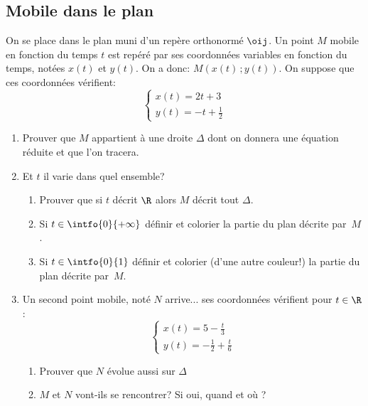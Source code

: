 \begin{exercice}
\section{Mobile dans le plan}
On se place dans le plan muni d'un rep\`ere orthonorm\'e $\oij$. Un
point $M$ mobile en fonction du temps $t$  est rep\'er\'e par ses
coordonn\'ees variables en fonction du temps, not\'ees $x(t)$ et
$y(t)$. On a donc: $M\left( x(t)\,;y(t)\right)$. On suppose que ces
coordonn\'ees v\'erifient:
\begin{equation}
  \label{eq:para}
  \left\{
\begin{array}{ll}
x(t)=2t+3\\
y(t)=-t+\frac12
\end{array}
\right.
\end{equation}

\begin{enumerate}
\item Prouver que $M$ appartient \`a une droite $\Delta$ dont on
  donnera une \'equation r\'eduite et que l'on tracera.

\item Et $t$ il varie dans quel ensemble?
  \begin{enumerate}
  \item Prouver que si $t$ d\'ecrit $\R$ alors $M$ d\'ecrit tout
    $\Delta$.

  \item Si $t\in\intfo{0}{+\infty}$ d\'efinir et colorier la partie du
    plan d\'ecrite par~$M$.
  \item Si $t\in\intfo{0}{1}$ d\'efinir et colorier (d'une autre
    couleur!) la partie du plan d\'ecrite par~$M$.
  \end{enumerate}

\item Un second point mobile, not\'e $N$ arrive... ses coordonn\'ees
  v\'erifient pour $t\in\R$:
\begin{equation}
  \label{eq:para2}
  \left\{
\begin{array}{ll}
x(t)=5-\frac{t}{3}\\
y(t)=-\frac12+\frac{t}{6}
\end{array}
\right.
\end{equation}

\begin{enumerate}
\item Prouver que $N$ \'evolue aussi sur $\Delta$
\item $M$ et $N$ vont-ils se rencontrer? Si oui, quand et o\`u ?
\end{enumerate}



\end{enumerate}
\end{exercice}
